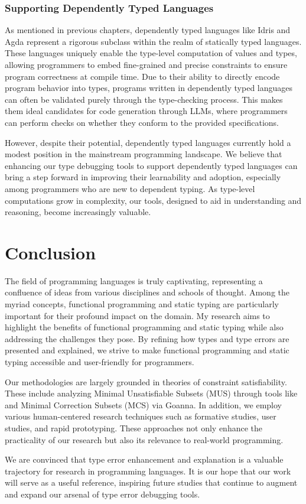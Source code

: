 \subsubsection{Supporting Dependently Typed Languages}

As mentioned in previous chapters, dependently typed languages like Idris and Agda represent a rigorous subclass within the realm of statically typed languages. These languages uniquely enable the type-level computation of values and types, allowing programmers to embed fine-grained and precise constraints to ensure program correctness at compile time. Due to their ability to directly encode program behavior into types, programs written in dependently typed languages can often be validated purely through the type-checking process. This makes them ideal candidates for code generation through LLMs, where programmers can perform checks on whether they conform to the provided specifications. 

However, despite their potential, dependently typed languages currently hold a modest position in the mainstream programming landscape. We believe that enhancing our type debugging tools to support dependently typed languages can bring a step forward in improving their learnability and adoption, especially among programmers who are new to dependent typing. As type-level computations grow in complexity, our tools, designed to aid in understanding and reasoning, become increasingly valuable. 


\section{Conclusion}


The field of programming languages is truly captivating, representing a confluence of ideas from various disciplines and schools of thought. Among the myriad concepts, functional programming and static typing are particularly important for their profound impact on the domain. My research aims to highlight the benefits of functional programming and static typing while also addressing the challenges they pose. By refining how types and type errors are presented and explained, we strive to make functional programming and static typing accessible and user-friendly for programmers.

Our methodologies are largely grounded in theories of constraint satisfiability. These include analyzing Minimal Unsatisfiable Subsets (MUS) through tools like \chameleon{} and Minimal Correction Subsets (MCS) via Goanna. In addition, we employ various human-centered research techniques such as formative studies, user studies, and rapid prototyping. These approaches not only enhance the practicality of our research but also its relevance to real-world programming.

We are convinced that type error enhancement and explanation is a valuable trajectory for research in programming languages. It is our hope that our work will serve as a useful reference, inspiring future studies that continue to augment and expand our arsenal of type error debugging tools.


